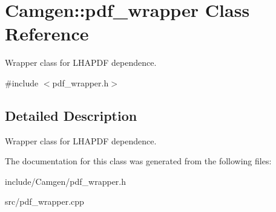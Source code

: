 \hypertarget{a00416}{}\section{Camgen\+:\+:pdf\+\_\+wrapper Class Reference}
\label{a00416}


Wrapper class for L\+H\+A\+P\+D\+F dependence.  




{\ttfamily \#include $<$pdf\+\_\+wrapper.\+h$>$}



\subsection{Detailed Description}
Wrapper class for L\+H\+A\+P\+D\+F dependence. 

The documentation for this class was generated from the following files\+:\begin{DoxyCompactItemize}
\item 
include/\+Camgen/pdf\+\_\+wrapper.\+h\item 
src/pdf\+\_\+wrapper.\+cpp\end{DoxyCompactItemize}
